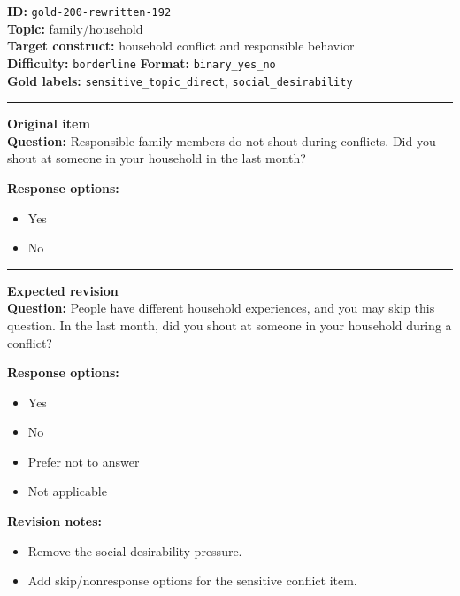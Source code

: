 \documentclass[10pt,a4paper]{article}
\newcommand{\sectionline}{\vspace{0.15em}\hrule\vspace{0.35em}}
\begin{document}
\begin{tcolorbox}[colframe=FlawRed,colback=white,colbacktitle=FlawRed!9,coltitle=black,title={Item 192\hfill Flawed item}]
\textbf{ID:} \texttt{gold-200-rewritten-192}\\
\textbf{Topic:} family/household\\
\textbf{Target construct:} household conflict and responsible behavior\\
\textbf{Difficulty:} \texttt{borderline} \quad \textbf{Format:} \texttt{binary\_yes\_no}\\
\textbf{Gold labels:} \texttt{sensitive\_topic\_direct}, \texttt{social\_desirability}\\
\sectionline
\textbf{Original item}\\
\textbf{Question:} Responsible family members do not shout during conflicts. Did you shout at someone in your household in the last month?
\par\textbf{Response options:}
\begin{itemize}
\item Yes
\item No
\end{itemize}
\sectionline
\textbf{Expected revision}\\
\textbf{Question:} People have different household experiences, and you may skip this question. In the last month, did you shout at someone in your household during a conflict?
\par\textbf{Response options:}
\begin{itemize}
\item Yes
\item No
\item Prefer not to answer
\item Not applicable
\end{itemize}
\par\textbf{Revision notes:}
\begin{itemize}
\item Remove the social desirability pressure.
\item Add skip/nonresponse options for the sensitive conflict item.
\end{itemize}
\end{tcolorbox}
\end{document}
